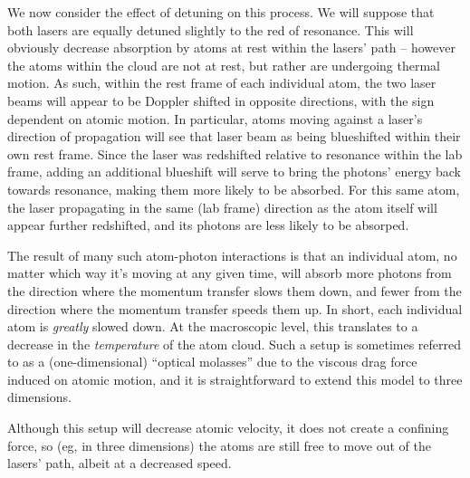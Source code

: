We now consider the effect of detuning on this process.  We will suppose that both lasers are equally detuned slightly to the red of resonance.  This will obviously decrease absorption by atoms at rest within the lasers' path -- however the atoms within the cloud are not at rest, but rather are undergoing thermal motion.  As such, within the rest frame of each individual atom, the two laser beams will appear to be Doppler shifted in opposite directions, with the sign dependent on atomic motion.  In particular, atoms moving against a laser's direction of propagation will see that laser beam as being blueshifted within their own rest frame.  Since the laser was redshifted relative to resonance within the lab frame, adding an additional blueshift will serve to bring the photons' energy back towards resonance, making them more likely to be absorbed.  For this same atom, the laser propagating in the same (lab frame) direction as the atom itself will appear further redshifted, and its photons are less likely to be absorped.  

The result of many such atom-photon interactions is that an individual atom, no matter which way it's moving at any given time, will absorb more photons from the direction where the momentum transfer slows them down, and fewer from the direction where the momentum transfer speeds them up.  In short, each individual atom is \emph{greatly} slowed down.  At the macroscopic level, this translates to a decrease in the \emph{temperature} of the atom cloud.  Such a setup is sometimes referred to as a (one-dimensional) ``optical molasses'' due to the viscous drag force induced on atomic motion, and it is straightforward to extend this model to three dimensions.

Although this setup will decrease atomic velocity, it does not create a confining force, so (eg, in three dimensions) the atoms are still free to move out of the lasers' path, albeit at a decreased speed.


